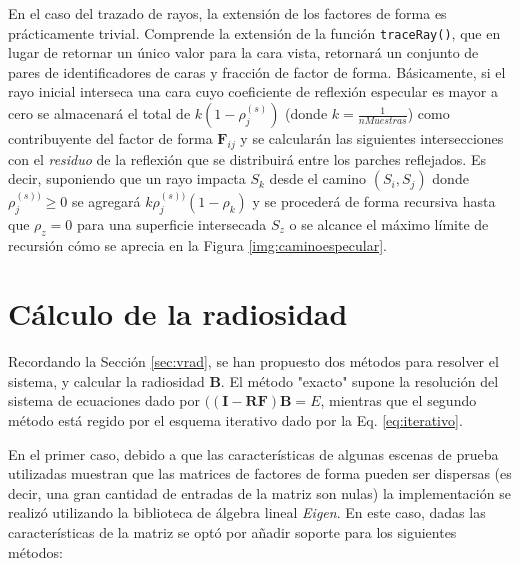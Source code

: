 En el caso del trazado de rayos, la extensión de los factores de forma es prácticamente trivial. Comprende la extensión de la función \verb|traceRay()|, que en lugar de retornar un único valor para la cara vista, retornará un conjunto de pares de identificadores de caras y fracción de factor de forma. Básicamente, si el rayo inicial interseca una cara cuyo coeficiente de reflexión especular es mayor a cero se almacenará el total de $k(1 - \rho^{(s)}_{j})$ (donde $k = \frac{1}{nMuestras}$) como contribuyente del factor de forma $\mathbf{F}_{ij}$ y se calcularán las siguientes intersecciones con el \textit{residuo} de la reflexión que se distribuirá entre los parches reflejados. Es decir, suponiendo que un rayo impacta $S_{k}$ desde el camino $(S_{i}, S_{j})$ donde $\rho^{(s))}_{j} \ge 0$ se agregará $k\rho^{(s))}_{j}(1 - \rho_{k})$ y se procederá de forma recursiva hasta que $\rho_{z} = 0$ para una superficie intersecada $S_{z}$ o se alcance el máximo límite de recursión cómo se aprecia en la Figura \ref{img:caminoespecular}.

\section{Cálculo de la radiosidad}

Recordando la Sección \ref{sec:vrad}, se han propuesto dos métodos para resolver el sistema, y calcular la radiosidad $\mathbf{B}$. El método "exacto" supone la resolución del sistema de ecuaciones dado por $(\mathbf{(I - RF)B} = E$, mientras que el segundo método está regido por el esquema iterativo dado por la Eq. \eqref{eq:iterativo}.

En el primer caso, debido a que las características de algunas escenas de prueba utilizadas muestran que las matrices de factores de forma pueden ser dispersas (es decir, una gran cantidad de entradas de la matriz son nulas) la implementación se realizó utilizando la biblioteca de álgebra lineal \textit{Eigen}. En este caso, dadas las características de la matriz se optó por añadir soporte para los siguientes métodos:

